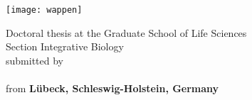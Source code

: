 \documentclass[
12pt, %
english, %
doublespacing, %
headsepline, %
chapterinoneline, %
]{MastersDoctoralThesis} %
\author{Jan Alexander \textsc{Freudenthal}} %
\begin{document}
 
\frontmatter %

\pagestyle{plain} 


\begin{titlepage}
  \begin{center}
    {\scshape\LARGE
       \univname\par}\vspace{1.0cm}
    \texttt{[image: wappen]}
    \vspace{1.0cm}
    
    {\color{mdtRed}\LARGE \ttitle\par}
    \vspace{1.0cm}
    
    Doctoral thesis at the Graduate School of Life Sciences \\
    Section Integrative Biology \\
    submitted by \\
    \vspace{1.0cm}
    \color{mdtRed}{\LARGE\authorname} \\
    \vspace{1.0cm}
    \color{black}from
    \textbf{L\"{u}beck, Schleswig-Holstein, Germany}
    
    

 



\end{center}
\end{titlepage}
\end{document}
